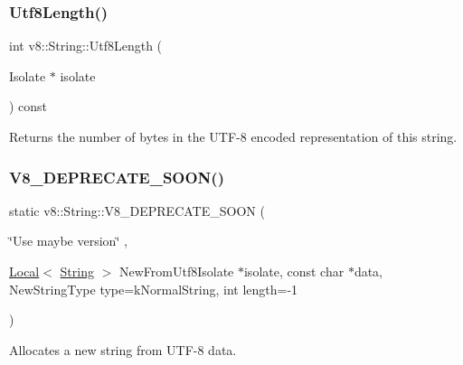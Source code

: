 \subsubsection{\texorpdfstring{Utf8\+Length()}{Utf8Length()}}
{\footnotesize\ttfamily int v8\+::\+String\+::\+Utf8\+Length (\begin{DoxyParamCaption}\item[{Isolate $\ast$}]{isolate }\end{DoxyParamCaption}) const}

Returns the number of bytes in the U\+T\+F-\/8 encoded representation of this string. \mbox{\label{classv8_1_1String_aa9d64688e3535b3daabafcc46a59ce5a}} 
\subsubsection{\texorpdfstring{V8\+\_\+\+D\+E\+P\+R\+E\+C\+A\+T\+E\+\_\+\+S\+O\+O\+N()}{V8\_DEPRECATE\_SOON()}\hspace{0.1cm}{\footnotesize\ttfamily [1/3]}}
{\footnotesize\ttfamily static v8\+::\+String\+::\+V8\+\_\+\+D\+E\+P\+R\+E\+C\+A\+T\+E\+\_\+\+S\+O\+ON (\begin{DoxyParamCaption}\item[{\char`\"{}Use maybe version\char`\"{}}]{,  }\item[{\mbox{\hyperlink{classv8_1_1Local}{Local}}$<$ \mbox{\hyperlink{classv8_1_1String}{String}} $>$ }]{New\+From\+Utf8Isolate $\ast$isolate, const char $\ast$data, New\+String\+Type type=k\+Normal\+String, int length=-\/1 }\end{DoxyParamCaption})\hspace{0.3cm}{\ttfamily [static]}}

Allocates a new string from U\+T\+F-\/8 data. \mbox{\label{classv8_1_1String_aeab948105979e2ffd61eb552b0da4e50}} 
